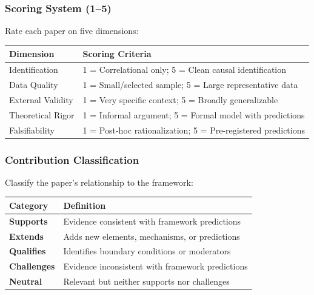 \documentclass[12pt,a4paper]{article}
\begin{document}
\subsubsection{Scoring System (1--5)}

Rate each paper on five dimensions:

\begin{center}
\renewcommand{\arraystretch}{1.2}
\begin{tabular}{lp{9cm}}
\hline
\textbf{Dimension} & \textbf{Scoring Criteria} \\
\hline
Identification & 1 = Correlational only; 5 = Clean causal identification \\
Data Quality & 1 = Small/selected sample; 5 = Large representative data \\
External Validity & 1 = Very specific context; 5 = Broadly generalizable \\
Theoretical Rigor & 1 = Informal argument; 5 = Formal model with predictions \\
Falsifiability & 1 = Post-hoc rationalization; 5 = Pre-registered predictions \\
\hline
\end{tabular}
\end{center}

\subsubsection{Contribution Classification}

Classify the paper's relationship to the framework:

\begin{center}
\renewcommand{\arraystretch}{1.2}
\begin{tabular}{lp{9cm}}
\hline
\textbf{Category} & \textbf{Definition} \\
\hline
\textbf{Supports} & Evidence consistent with framework predictions \\
\textbf{Extends} & Adds new elements, mechanisms, or predictions \\
\textbf{Qualifies} & Identifies boundary conditions or moderators \\
\textbf{Challenges} & Evidence inconsistent with framework predictions \\
\textbf{Neutral} & Relevant but neither supports nor challenges \\
\hline
\end{tabular}
\end{center}
\end{document}
